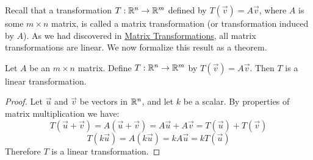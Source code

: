 \documentclass{ximera}
\begin{document}


Recall that a transformation $T:\mathbb{R}^n\rightarrow\mathbb{R}^m$ defined by $T(\vec{v})=A\vec{v}$, where $A$ is some $m\times n$ matrix, is called a matrix transformation (or transformation induced by $A$).  As we had discovered in \href{https://ximera.osu.edu/linearalgebradzv3/LinearAlgebraInteractiveIntro/LTR-0005/main}{Matrix Transformations}, all matrix transformations are linear.  We now formalize this result as a theorem.

 \begin{theorem}\label{th:matrixtran} Let $A$ be an $m\times n$ matrix.  Define $T:\mathbb{R}^n\rightarrow\mathbb{R}^m$ by $T(\vec{v})=A\vec{v}$.  Then $T$ is a linear transformation.
\end{theorem}

\begin{proof}  Let $\vec{u}$ and $\vec{v}$ be vectors in $\mathbb{R}^n$, and let $k$ be a scalar.  By properties of matrix multiplication we have:
$$T(\vec{u}+\vec{v})=A(\vec{u}+\vec{v})=A\vec{u}+A\vec{v}=T(\vec{u})+T(\vec{v})$$
$$T(k\vec{u})=A(k\vec{u})=kA\vec{u}=kT(\vec{u})$$
Therefore $T$ is a linear transformation.
\end{proof}
\end{document}
